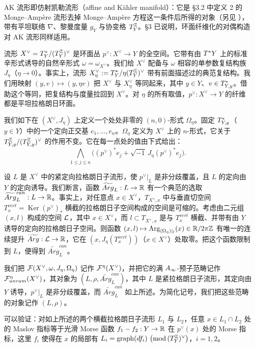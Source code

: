 \begin{yizhu}[AK 流形]
AK 流形即仿射凯勒流形（affine and K\"ahler manifold）：它是 \S3.2 中定义 2 的 Monge--Amp\`ere 流形去掉 Monge--Amp\`ere 方程这一条件后所得的对象（另见 \cite{CY}），带有平坦联络 $\nabla$、黎曼度量 $g_Y$ 与协变格 $T^{\mathbb{Z}}_Y$。\S3 已说明，环面纤维化的对偶构造对 AK 流形同样适用。
\end{yizhu}

流形 $X^\vee=T^{*}_Y/(T^{\mathbb{Z}}_Y)^\vee$ 是环面丛 $p^\vee:X^\vee\to Y$ 的全空间。它带有由 $T^{*} Y$ 上的标准辛形式诱导的自然辛形式 $\omega=\omega_{X^\vee}$。我们给 $X^\vee$ 配备与 $\omega$ 相容的单参数复结构族 $J_\eta$（$\eta\to0$）。事实上，流形 $X^\vee_\eta:=T^{*}_Y/\eta(T^{\mathbb{Z}}_Y)^\vee$ 带有前面描述过的典范复结构。我们用映射 $(y,v)\mapsto(y,\eta v)$ 把 $X^\vee$ 与 $X^\vee_\eta$ 等同起来，其中 $y\in Y$、$v\in T^{*}_{Y,y}$。借助这个等同，把复结构与度量拉回到 $X^\vee$。对 $\eta$ 的所有取值，$p^\vee:X^\vee\to Y$ 的纤维都是平坦拉格朗日环面。

我们如下在 $(X^\vee,J_\eta)$ 上定义一个处处非零的 $(n,0)$-形式 $\Omega_\eta$。固定 $T^{*}_{Y,y}$（$y\in Y$）中的一个定向正交基 $e_1,\dots,e_n$。$\Omega_\eta$ 定义为 $X^\vee$ 上的 $n$-形式，它关于 $T^{\mathbb{Z}}_{Y,y}/(T^{\mathbb{Z}}_{Y,y})^\vee$ 的作用不变。它在每一点处的值由下式给出：
\[
  \bigwedge_{1\le j\le n}\bigl((p^\vee)^*e_j+\sqrt{-1}\,J_\eta(p^\vee)^*e_j\bigr).
\]

设 $L$ 是 $X^\vee$ 中的紧定向拉格朗日子流形，使 $p^\vee|_L$ 是非分歧覆盖，且 $L$ 的定向由 $Y$ 的定向诱导。我们断言，函数 $\widetilde{Arg}_L:L\to\mathbb{R}$ 有一个典范的选取 $\widetilde{Arg}_L^{can}:L\to\mathbb{R}$。事实上，对任意点 $x\in X^\vee$，$T_{X^\vee,x}$ 中与垂直切空间 $T^{vert}_x=\operatorname{Ker}(p^\vee)_*$ 横截的拉格朗日子空间构成的空间是可缩的。考虑由二元组 $(x,l)$ 构成的空间 $\mathcal{L}$，其中 $x\in X^\vee$，而 $l\subset T_{X^\vee,x}$ 是与 $T^{vert}_x$ 横截、并带有由 $Y$ 诱导的定向的拉格朗日子空间。则函数 $(x,l)\mapsto\mathrm{Arg}_{(\Omega_\eta)|_l}(x)\in\mathbb{R}/2\pi\mathbb{Z}$ 有唯一的连续提升 $\widetilde{Arg}:\mathcal{L}\to\mathbb{R}$，它在 $(x,J_\eta(T^{vert}_x))$（$x\in X^\vee$）处取零。把这个函数限制到 $L$，便得到 $\widetilde{Arg}_L^{can}$。

我们把 $\mathcal{F}(X^\vee,\omega,J_\eta,\Omega_\eta)$ 记作 $\mathcal{F}^\eta(X^\vee)$，并把它的满 $A_{\infty}$-预子范畴记作 $\mathcal{F}^\eta_{unram}(X^\vee)$，其对象为 $(L,\rho,\widetilde{Arg}_L^{can})$，其中 $L$ 是紧拉格朗日子流形，其定向由 $Y$ 诱导，$p^\vee|_L$ 是非分歧覆盖，而 $\widetilde{Arg}_L^{can}$ 如上所述。为简化记号，我们把这些范畴的对象记作 $(L,\rho)$。

\begin{rmk}
可以验证：对如上所述的两个横截拉格朗日子流形 $L_1$ 与 $L_2$，任意 $x\in L_1\cap L_2$ 处的 Maslov 指标等于光滑 Morse 函数 $f_1-f_2:Y\to\mathbb{R}$ 在 $p^\vee(x)$ 处的 Morse 指标，这里 $f_i$ 使得在 $x$ 的局部有 $L_i=\operatorname{graph}(df_i)\ \bigl(\mathrm{mod}\,(\TYZ)^\vee\bigr)$，$i=1,2$。
\end{rmk}

